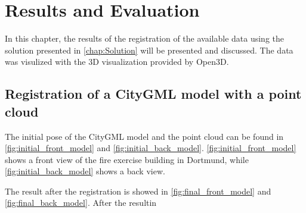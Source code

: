 

    \chapter{Results and Evaluation}

    In this chapter, the results of the registration of the available data using the solution presented in \autoref{chap:Solution} will be presented and discussed.
    The data was visulized with the 3D visualization provided by Open3D. 

    \section{Registration of a CityGML model with a point cloud}
        The initial pose of the CityGML model and the point cloud can be found in \autoref{fig:initial_front_model} and \autoref{fig:initial_back_model}.
        \autoref{fig:initial_front_model} shows a front view of the fire exercise building in Dortmund, while \autoref{fig:initial_back_model} shows a back view.

        The result after the registration is showed in \autoref{fig:final_front_model} and \autoref{fig:final_back_model}.
        After the resultin

